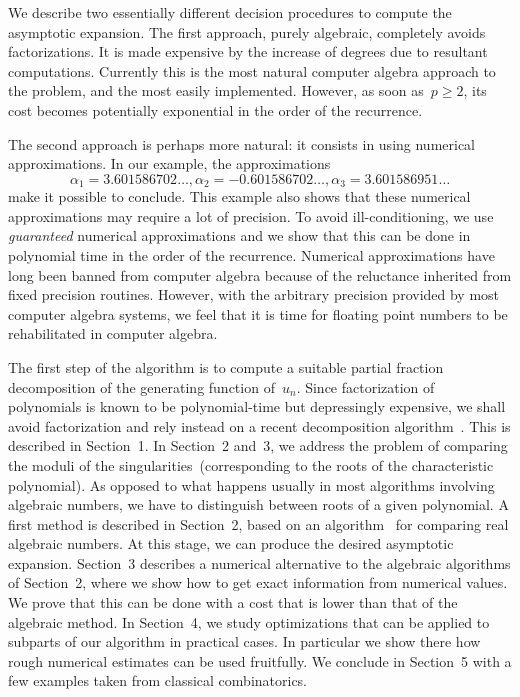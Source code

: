 We describe two essentially different decision procedures to
compute the asymptotic expansion. The first approach, purely algebraic,
completely avoids factorizations. It is made expensive by the increase
of degrees due to resultant computations. Currently this is the most
natural computer algebra approach to the problem, and the most easily
implemented. However, as soon as~$p\ge2$,
its cost becomes potentially exponential in the order of the recurrence.

The second approach is perhaps more natural: it consists in using
numerical approximations. In our example, the approximations
$$\alpha_1=3.601586702\ldots,\alpha_2=- 0.601586702\ldots,
\alpha_3=3.601586951\ldots$$
make it possible to conclude. This example also shows that these
numerical approximations may require a lot of precision. To avoid
ill-conditioning, we use {\em 
guaranteed \/} numerical approximations and we show that this can be
done in polynomial time in the order of the recurrence. Numerical
approximations have long been banned from computer algebra because of
the reluctance inherited from fixed precision routines. However, with
the arbitrary precision provided by most computer algebra systems, we
feel that it is time for floating point numbers to be rehabilitated in
computer algebra. 

The first step  of the algorithm  is  to  compute  a suitable  partial
fraction decomposition of the generating function of~$u_n$.  Since
factorization of polynomials is
known to be polynomial-time but depressingly expensive, we shall avoid
factorization  and rely instead on  a recent decomposition
algorithm~\cite{BrSa92}.  This is described  in Section~1.  In 
Section~2 and~3,  we  address the problem  of comparing  the moduli
of  the
singularities~(corresponding to  the   roots   of the   characteristic
polynomial).  As opposed to what happens usually in
most algorithms involving algebraic numbers, we have to distinguish
between roots of a given polynomial.
A first method is described in Section~2, based
on  an algorithm~\cite{CoRo88} for comparing real  algebraic numbers.
At this stage, we 
can produce the desired asymptotic expansion. Section~3 describes a
numerical alternative to the algebraic algorithms of Section~2, where 
we show how to get exact information from numerical values. We
prove that this can be done with a cost that is lower than that of
the algebraic method.
 In Section~4, we study optimizations  that can be applied to subparts
of our algorithm in practical cases. In  particular  we show there how
rough numerical  estimates can be used fruitfully.   We   conclude in
Section~5 with a few examples taken from classical combinatorics.

